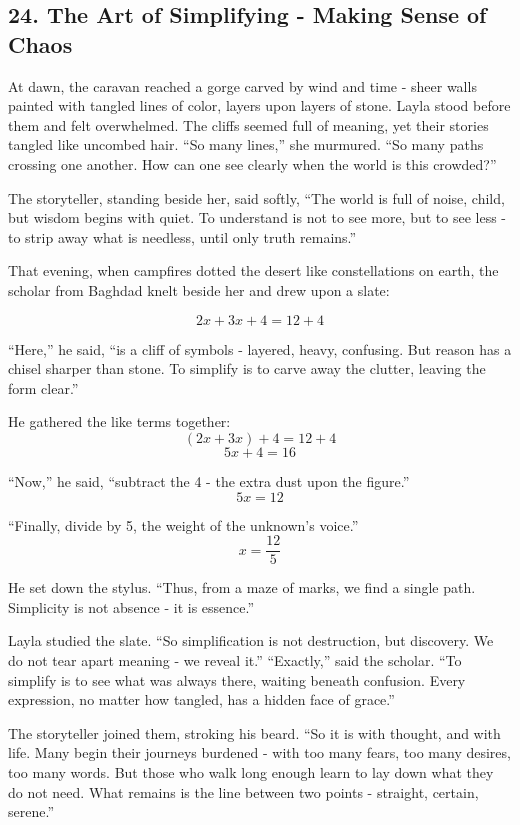 \documentclass[
  letterpaper,
  DIV=11,
  numbers=noendperiod]{scrreprt}
\begin{document}
\subsection{24. The Art of Simplifying - Making Sense of
Chaos}\label{the-art-of-simplifying---making-sense-of-chaos}

At dawn, the caravan reached a gorge carved by wind and time - sheer
walls painted with tangled lines of color, layers upon layers of stone.
Layla stood before them and felt overwhelmed. The cliffs seemed full of
meaning, yet their stories tangled like uncombed hair. ``So many
lines,'' she murmured. ``So many paths crossing one another. How can one
see clearly when the world is this crowded?''

The storyteller, standing beside her, said softly, ``The world is full
of noise, child, but wisdom begins with quiet. To understand is not to
see more, but to see less - to strip away what is needless, until only
truth remains.''

That evening, when campfires dotted the desert like constellations on
earth, the scholar from Baghdad knelt beside her and drew upon a slate:

\[
2x + 3x + 4 = 12 + 4
\]

``Here,'' he said, ``is a cliff of symbols - layered, heavy, confusing.
But reason has a chisel sharper than stone. To simplify is to carve away
the clutter, leaving the form clear.''

He gathered the like terms together: \[
(2x + 3x) + 4 = 12 + 4
\] \[
5x + 4 = 16
\]

``Now,'' he said, ``subtract the 4 - the extra dust upon the figure.''
\[
5x = 12
\]

``Finally, divide by 5, the weight of the unknown's voice.'' \[
x = \frac{12}{5}
\]

He set down the stylus. ``Thus, from a maze of marks, we find a single
path. Simplicity is not absence - it is essence.''

Layla studied the slate. ``So simplification is not destruction, but
discovery. We do not tear apart meaning - we reveal it.'' ``Exactly,''
said the scholar. ``To simplify is to see what was always there, waiting
beneath confusion. Every expression, no matter how tangled, has a hidden
face of grace.''

The storyteller joined them, stroking his beard. ``So it is with
thought, and with life. Many begin their journeys burdened - with too
many fears, too many desires, too many words. But those who walk long
enough learn to lay down what they do not need. What remains is the line
between two points - straight, certain, serene.''
\end{document}
